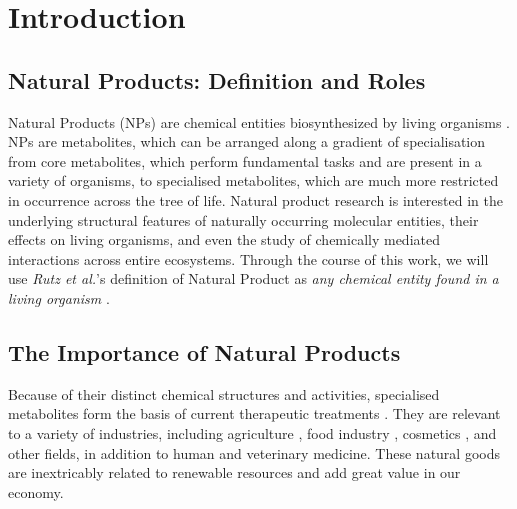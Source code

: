 \documentclass[
11pt, %
oneside, %
english, %
singlespacing, %
headsepline, %
chapterinoneline, %
]{MastersDoctoralThesis} %
\begin{document}



\mainmatter %

\pagestyle{thesis} %


%
% 
%
% 
% 
%

\chapter{Introduction}\label{chap:intro}

\section{Natural Products: Definition and Roles}\label{sec:NP def and roles}
\cite{AllNatural2007} Natural Products (NPs) are chemical entities biosynthesized by living organisms \cite{AllNatural2007}. NPs are metabolites, which can be arranged along a gradient of specialisation from core metabolites, which perform fundamental tasks and are present in a variety of organisms, to specialised metabolites, which are much more restricted in occurrence across the tree of life. Natural product research is interested in the underlying structural features of naturally occurring molecular entities, their effects on living organisms, and even the study of chemically mediated interactions across entire ecosystems. Through the course of this work, we will use \textit{Rutz et al.}'s definition of Natural Product as \textit{ any chemical entity found in a living organism} \cite{rutzLOTUSInitiativeOpen2022}.

\section{The Importance of Natural Products}
Because of their distinct chemical structures and activities, specialised metabolites form the basis of current therapeutic treatments  \cite{harveyReemergenceNaturalProducts2015}. They are relevant to a variety of industries, including agriculture \cite{yanImpactProspectNatural2018}, food industry \cite{gonzalez-manzanoApplicationsNaturalProducts2021}, cosmetics \cite{liuNaturalProductsCosmetics2022}, and other fields, in addition to human and veterinary medicine. These natural goods are inextricably related to renewable resources and add great value in our economy.
\end{document}
